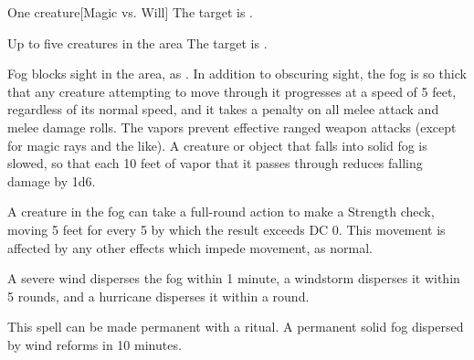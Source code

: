 \begin{spellheader}
    \spellrng{\rngmed}
    \spelldur{\durshort}
\end{spellheader}
\begin{spelleffects}
    \begin{spelltarget}{One creature}[Magic vs. Will]
        \spellsuccess The target is \slowed.
    \end{spelltarget}
\end{spelleffects}

\begin{spellheader}
    \spelldur{\durshort}
\end{spellheader}
\begin{spelleffects}
    \begin{spelltargets}{Up to five creatures in the area}
        \spelleffect The target is \slowed.
    \end{spelltargets}
\end{spelleffects}

\begin{spellheader}
    \spelldur{\durshort}
\end{spellheader}
\begin{spelleffects}
    \spelleffect Fog blocks sight in the area, as . In addition to obscuring sight, the fog is so thick that any creature attempting to move through it progresses at a speed of 5 feet, regardless of its normal speed, and it takes a  penalty on all melee attack and melee damage rolls. The vapors prevent effective ranged weapon attacks (except for magic rays and the like). A creature or object that falls into solid fog is slowed, so that each 10 feet of vapor that it passes through reduces falling damage by 1d6.
    \par A creature in the fog can take a full-round action to make a Strength check, moving 5 feet for every 5 by which the result exceeds DC 0. This movement is affected by any other effects which impede movement, as normal.
\end{spelleffects}
\begin{spellfooter}
    \spellnotes \fogspellnotes A severe wind disperses the fog within 1 minute, a windstorm disperses it within 5 rounds, and a hurricane disperses it within a round.

    This spell can be made permanent with a  ritual. A permanent solid fog dispersed by wind reforms in 10 minutes.
\end{spellfooter}

